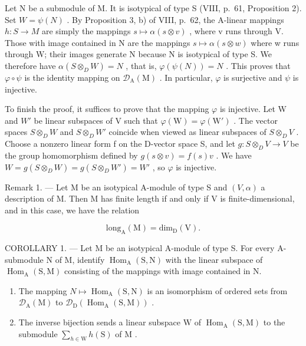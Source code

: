 Let N be a submodule of M. It is isotypical of type S (VIII, p.~61, Proposition 2). Set \(W = \psi(N)\) . By Proposition 3, b) of VIII, p.~62, the A-linear mappings \(h : S \to M\) are simply the mappings \(s \mapsto \alpha(s \otimes v)\) , where v runs through V. Those with image contained in N are the mappings \(s \mapsto \alpha(s \otimes w)\) where w runs through W; their images generate N because N is isotypical of type S. We therefore have \(\alpha(S \otimes_{D} W) = N\) , that is, \(\varphi(\psi(N)) = N\) . This proves that \(\varphi \circ \psi\) is the identity mapping on \(\mathcal{D}_{\mathrm{A}}(\mathrm{M})\) . In particular, \(\varphi\) is surjective and \(\psi\) is injective.

To finish the proof, it suffices to prove that the mapping \(\varphi\) is injective. Let W and \(W'\) be linear subspaces of V such that \(\varphi(\mathrm{W}) = \varphi(\mathrm{W}')\) . The vector spaces \(S \otimes_{D} W\) and \(S \otimes_{D} W'\) coincide when viewed as linear subspaces of \(S \otimes_{D} V\) . Choose a nonzero linear form f on the D-vector space S, and let \(g : S \otimes_{D} V \to V\) be the group homomorphism defined by \(g(s \otimes v) = f(s)v\) . We have \(W = g(S \otimes_{D} W) = g(S \otimes_{D} W') = W'\) , so \(\varphi\) is injective.

Remark 1. --- Let M be an isotypical A-module of type S and \((V, \alpha)\) a description of M. Then M has finite length if and only if V is finite-dimensional, and in this case, we have the relation

\[
\mathrm{long} _ {\mathrm{A}} (\mathrm{M}) = \mathrm{dim} _ {\mathrm{D}} (\mathrm{V}).
\]

COROLLARY 1. --- Let M be an isotypical A-module of type S. For every A-submodule N of M, identify \(\operatorname{Hom}_{\mathrm{A}}(\mathrm{S},\mathrm{N})\) with the linear subspace of \(\operatorname{Hom}_{\mathrm{A}}(\mathrm{S},\mathrm{M})\) consisting of the mappings with image contained in N.

\begin{enumerate}
\def\labelenumi{\alph{enumi})}
\item
  The mapping \(N \mapsto \operatorname{Hom}_{\mathrm{A}}(\mathrm{S}, \mathrm{N})\) is an isomorphism of ordered sets from \(\mathcal{D}_{\mathrm{A}}(\mathrm{M})\) to \(\mathcal{D}_{\mathrm{D}}(\operatorname{Hom}_{\mathrm{A}}(\mathrm{S}, \mathrm{M}))\) .
\item
  The inverse bijection sends a linear subspace \(\mathrm{W}\) of \(\operatorname{Hom}_{\mathrm{A}}(\mathrm{S}, \mathrm{M})\) to the submodule \(\sum_{h \in \mathrm{W}} h(\mathrm{S})\) of \(\mathrm{M}\) .
\end{enumerate}

